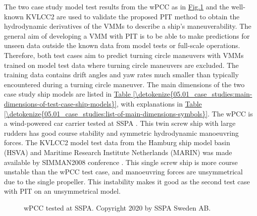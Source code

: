 \documentclass[review]{elsarticle}
\let\sphinxpxdimen\pdfpxdimen\else\newdimen\sphinxpxdimen
\begin{document}
The two case study model test results from the wPCC as in \hyperref[\detokenize{05.01_case_studies:wpcc-mdl}]{Fig.\@ \ref{\detokenize{05.01_case_studies:wpcc-mdl}}} and the well-known KVLCC2 are used to validate the proposed PIT method to obtain the hydrodynamic derivatives of the VMMs to describe a ship’s maneuverability. The general aim of developing a VMM with PIT is to be able to make predictions for unseen data outside the known data from model tests or full-scale operations. Therefore, both test cases aim to predict turning circle maneuvers with VMMs trained on model test data where turning circle maneuvers are excluded. The training data contains drift angles and yaw rates much smaller than typically encountered during a turning circle maneuver.
The main dimensions of the two case study ship models are listed in \hyperref[\detokenize{05.01_case_studies:main-dimensions-of-test-case-ship-models}]{Table \ref{\detokenize{05.01_case_studies:main-dimensions-of-test-case-ship-models}}}, with explanations in \hyperref[\detokenize{05.01_case_studies:list-of-main-dimensions-symbols}]{Table \ref{\detokenize{05.01_case_studies:list-of-main-dimensions-symbols}}}. The wPCC is a wind-powered car carrier tested at SSPA \cite{alexandersson_wpcc_2022}. This twin screw ship with large rudders has good course stability and symmetric hydrodynamic manoeuvring forces. The KVLCC2 model test data from the Hamburg ship model basin (HSVA) and Maritime Research Institute Netherlands (MARIN) was made available by SIMMAN2008 conference \cite{stern_experience_2011}. This single screw ship is more course unstable than the wPCC test case, and manoeuvring forces are unsymmetrical due to the single propeller. This instability makes it good as the second test case with PIT on an unsymmetrical model.

 \begin{figure}[H]
 \centering
 \capstart

 \noindent\sphinxincludegraphics[height=150\sphinxpxdimen]{{wpcc_mdl}.png}
\caption{wPCC tested at SSPA. Copyright 2020 by SSPA Sweden AB.}\label{\detokenize{05.01_case_studies:wpcc-mdl}}\end{figure}
\end{document}
